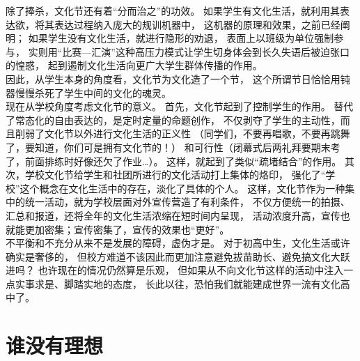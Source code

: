 \documentclass{article}
\begin{document}
    除了捧杀，文化节还有着“分而治之”的功效。
    如果学生有文化生活，就利用其表达欲，将其表达过程纳入庞大的规训机器中，
    这机器的原理和效果，之前已经阐明；
    如果学生没有文化生活，就进行隐形的劝退，
    表面上以班级为单位强制参与，
    实则用“比赛—汇演”这种高压力模式让学生切身体会到长久失语后被迫张口的惶惑，
    起到遏制文化生活向更广大学生群体传播的作用。\\

    因此，从学生本身的角度看，文化节为文化造了一个节，
    这个所谓节日恰恰用钝器慢慢杀死了学生中间的文化的魂灵。\\

    现在从学校角度考虑文化节的意义。
    首先，文化节起到了控制学生的作用。
    替代了常态化的自由表达的，是定时定量的命题创作，
    不仅剥夺了学生的主动性，而且削弱了文化节以外进行文化生活的正义性
    （同学们，不要再唱歌，不要再跳舞了，要知道，你们可是拥有文化节的！）
    和可行性（闭幕式后两礼拜要期末考了，前面排练时好像还欠了作业…）。
    这样，就起到了类似“疏堵结合”的作用。
    其次，学校文化节给学生和社团所进行的文化活动打上集体的烙印，
    强化了“学校”这个概念在文化生活中的存在，淡化了具体的个人。
    这样，文化节作为一种集中的统一活动，就为学校层面对外宣传营造了有利条件，
    不仅方便统一的拍摄、汇总和报道，还将全年的文化生活浓缩在短时间内呈现，
    活动浓度升高，宣传也就能更加密集；宣传密集了，宣传的效果也“更好”。\\

    不平衡和不充分从来不是发展的障碍，虚伪才是。
    对于初高中生，文化生活或许确实是奢侈的，
    但校方难道不该因此而更加注意避免拔苗助长、避免搞文化大跃进吗？
    也许现在的情况仍然算是乐观，
    但如果从不向文化节这样的活动中注入一点实事求是、脚踏实地的态度，
    长此以往，恐怕我们就能建成世界一流有文化高中了。\\

    \newpage
    
\section{谁没有理想}
\end{document}
